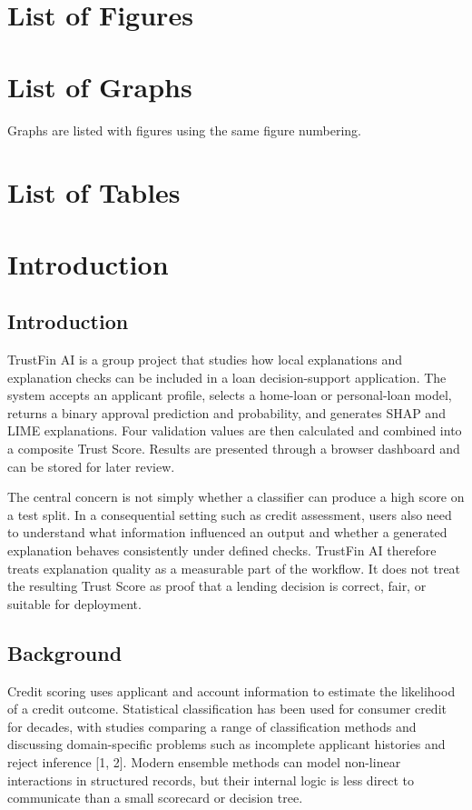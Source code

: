 \documentclass[12pt,a4paper]{report}
\begin{document}
\chapter*{List of Figures}
\listoffigures
\chapter*{List of Graphs}
\noindent Graphs are listed with figures using the same figure numbering.
\chapter*{List of Tables}
\listoftables
\chapter{Introduction}
\section{Introduction}
TrustFin AI is a group project that studies how local explanations and explanation checks can be included in a loan decision-support application. The system accepts an applicant profile, selects a home-loan or personal-loan model, returns a binary approval prediction and probability, and generates SHAP and LIME explanations. Four validation values are then calculated and combined into a composite Trust Score. Results are presented through a browser dashboard and can be stored for later review.

The central concern is not simply whether a classifier can produce a high score on a test split. In a consequential setting such as credit assessment, users also need to understand what information influenced an output and whether a generated explanation behaves consistently under defined checks. TrustFin AI therefore treats explanation quality as a measurable part of the workflow. It does not treat the resulting Trust Score as proof that a lending decision is correct, fair, or suitable for deployment.

\section{Background}
Credit scoring uses applicant and account information to estimate the likelihood of a credit outcome. Statistical classification has been used for consumer credit for decades, with studies comparing a range of classification methods and discussing domain-specific problems such as incomplete applicant histories and reject inference [1, 2]. Modern ensemble methods can model non-linear interactions in structured records, but their internal logic is less direct to communicate than a small scorecard or decision tree.
\end{document}
